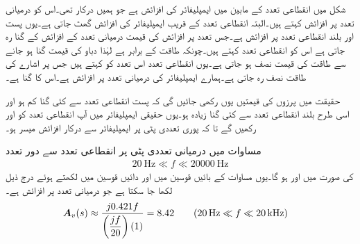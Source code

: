 شکل  میں انقطاعی تعدد کے مابین  میں ایمپلیفائر کی افزائش  ہے جو ہمیں درکار تھی۔اس کو درمیانی تعدد پر افزائش کہتے ہیں۔البتہ انقطاعی تعدد کے قریب ایمپلیفائر کی افزائش گھٹ جاتی ہے۔یوں پست اور بلند انقطاعی تعدد پر افزائش  ہے۔جس تعدد پر افزائش کی قیمت درمیانی تعدد کے افزائش کے  گنا رہ جاتی ہے اس کو انقطاعی تعدد کہتے ہیں۔چونکہ طاقت  کے برابر ہے لہٰذا دباو کی قیمت  گنا ہو جانے سے طاقت کی قیمت نصف ہو جاتی ہے۔یوں انقطاعی تعدد اس تعدد کو کہتے ہیں جس پر اشارے کی طاقت نصف رہ جاتی ہے۔ہمارے ایمپلیفائر کی درمیانی تعدد پر افزائش   ہے۔اس کا  گنا   ہے۔

حقیقت میں پرزوں کی قیمتیں یوں رکھی جائیں گی کہ پست انقطاعی تعدد  سے کئی گنا کم ہو اور اسی طرح بلند انقطاعی تعدد  سے کئی گنا زیادہ ہو۔یوں حقیقی ایمپلیفائر میں آپ انقطاعی تعدد کو  اور  رکھیں گے تا کہ پوری تعددی پٹی پر ایمپلیفائر سے درکار افزائش میسر ہو۔ 

مساوات  میں درمیانی تعددی پٹی پر انقطاعی تعدد سے دور  تعدد
\begin{align*}
\SI{20}{\hertz} \ll f \ll \SI{20000}{\hertz}
\end{align*}
کی صورت میں  اور  ہو گا۔یوں مساوات  کے بائیں قوسین میں اور دائیں قوسین میں  لکھتے ہوئے درج ذیل لکھا جا سکتا ہے جو درمیانی تعدد پر افزائش ہے۔
\begin{align*}
{\ensuremath{{\boldsymbol{A}}}}_v(s)&\approx  \dfrac{j 0.421f}{\left(\dfrac{jf }{20}\right)\left(1\right)}=8.42  \quad \quad (\SI{20}{\hertz} \ll f \ll \SI{20}{\kilo\hertz})
\end{align*}

